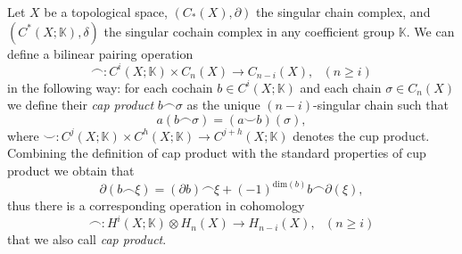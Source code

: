 \documentclass[12pt]{article}
\begin{document}
\newcommand{\CAP}{\frown}
\newcommand{\CUP}{\smile}

Let $X$ be a topological space, $(C_*(X),\partial)$ the singular chain complex, and $(C^*(X;\mathbb K),\delta)$ the singular cochain complex in any coefficient group $\mathbb K$. We can define a bilinear pairing operation $$\CAP: C^i(X;\mathbb K)\times C_n(X)\rightarrow C_{n-i}(X),\ \ \ (n\geq i)$$
in the following way: for each cochain $b\in C^i(X;\mathbb K)$ and each chain $\sigma\in C_n(X)$ we define their  \emph{cap product} $b\CAP\sigma$ as the unique  $(n-i)$-singular chain such that $$a(b\CAP\sigma)=(a\CUP b)(\sigma),$$ where $\CUP: C^j(X;\mathbb K)\times C^h(X;\mathbb K)\rightarrow C^{j+h}(X;\mathbb K)$ denotes the cup product. 
Combining the definition of cap product with the standard properties of cup product we obtain that $$\partial (b\CAP\xi)=(\partial b)\CAP\xi + (-1)^{\mathrm{dim}(b)}b\CAP\partial(\xi),$$ thus there is a corresponding operation in cohomology $$\CAP: H^i(X;\mathbb K)\otimes H_n(X)\rightarrow H_{n-i}(X),\ \ \ (n\geq i)$$ that we also call \emph{cap product}.
\end{document}
